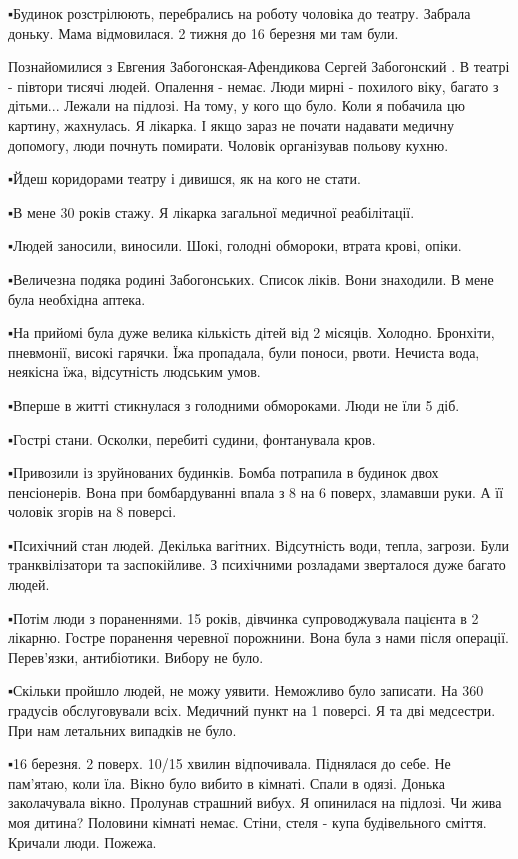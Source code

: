 ▪️Будинок розстрілюють, перебрались на роботу чоловіка до театру. Забрала
доньку. Мама відмовилася. 2 тижня до 16 березня ми там були. 

Познайомилися з Евгения Забогонская-Афендикова Сергей Забогонский . В театрі -
півтори тисячі людей. Опалення - немає. Люди мирні - похилого віку, багато з
дітьми... Лежали на підлозі. На тому, у кого що було. Коли я побачила цю
картину, жахнулась. Я лікарка. І якщо зараз не почати надавати медичну
допомогу, люди почнуть помирати. Чоловік організував польову кухню. 

▪️Йдеш коридорами театру і дивишся, як на кого не стати. 

▪️В мене 30 років стажу. Я лікарка загальної медичної реабілітації. 

▪️Людей заносили, виносили. Шокі, голодні обмороки, втрата крові, опіки. 

▪️Величезна подяка родині Забогонських. Список ліків. Вони знаходили. В мене
була необхідна аптека. 

▪️На прийомі була дуже велика кількість дітей від 2 місяців. Холодно. Бронхіти,
пневмонії, високі гарячки. Їжа пропадала, були поноси, рвоти. Нечиста вода,
неякісна їжа, відсутність людським умов. 

▪️Вперше в житті стикнулася з голодними обмороками. Люди не їли 5 діб. 

▪️Гострі стани. Осколки, перебиті судини, фонтанувала кров.  

▪️Привозили із зруйнованих будинків. Бомба потрапила в будинок двох пенсіонерів.
Вона при бомбардуванні впала з 8 на 6 поверх, зламавши руки. А її чоловік
згорів на 8 поверсі. 

▪️Психічний стан людей. Декілька вагітних. Відсутність води, тепла, загрози.
Були транквілізатори та заспокійливе. З психічними розладами зверталося дуже
багато людей. 

▪️Потім люди з пораненнями. 15 років, дівчинка супроводжувала пацієнта в 2
лікарню. Гостре поранення черевної порожнини. Вона була з нами після операції.
Перев'язки, антибіотики. Вибору не було. 

▪️Скільки пройшло людей, не можу уявити. Неможливо було записати. На 360
градусів обслуговували всіх. Медичний пункт на 1 поверсі. Я та дві медсестри.
При нам летальних випадків не було. 

▪️16 березня. 2 поверх. 10/15 хвилин відпочивала. Піднялася до себе. Не
пам'ятаю, коли їла. Вікно було вибито в кімнаті. Спали в одязі. Донька
заколачувала вікно. Пролунав страшний вибух. Я опинилася на підлозі. Чи жива
моя дитина? Половини кімнаті немає. Стіни, стеля - купа будівельного сміття.
Кричали люди. Пожежа.

